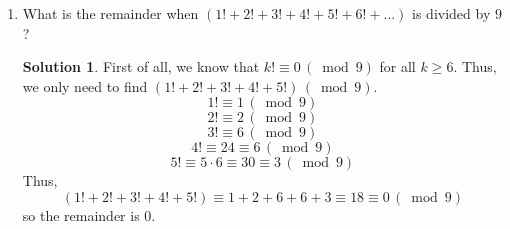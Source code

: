 \documentclass{article}
\theoremstyle{definition}
\newtheorem*{solution}{Solution}
\begin{document}
\begin{multicols}{2}
\begin{enumerate}
        \item What is the remainder when $(1! + 2! + 3! + 4! + 5! + 6! + \dots)$ is divided by $9$?
            \begin{solution}
                First of all, we know that $k! \equiv 0 \, (\bmod 9)$ for all $k \geq 6$.
                Thus, we only need to find $(1! + 2! + 3! + 4! + 5!) \, (\bmod 9)$.
                $$1! \equiv 1 \, (\bmod 9)$$
                $$2! \equiv 2 \, (\bmod 9)$$
                $$3! \equiv 6 \, (\bmod 9)$$
                $$4! \equiv 24 \equiv 6 \, (\bmod 9)$$
                $$5! \equiv 5 \cdot 6 \equiv 30 \equiv 3 \, (\bmod 9)$$
                Thus, $$(1! + 2! + 3! + 4! + 5!) \equiv 1 + 2 + 6 + 6 + 3 \equiv 18 \equiv 0 \, (\bmod 9)$$
                so the remainder is 0.
            \end{solution}
    \end{enumerate}
\end{multicols}
\end{document}

